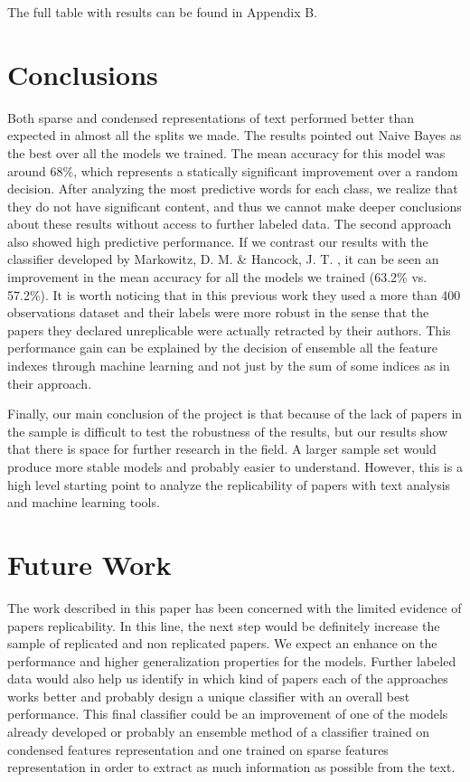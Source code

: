 \documentclass[12pt]{article}
\begin{document}
The full table with results can be found in Appendix B. 


\section{Conclusions}

Both sparse and condensed representations of text performed better than expected in almost all the splits we made. The results pointed out Naive Bayes as the best over all the models we trained. The mean accuracy for this model was around 68\%, which represents a statically significant improvement over a random decision.  After analyzing the most predictive words for each class, we realize that they do not have significant content, and thus we cannot make deeper conclusions about these results without access to further labeled data.  
The second approach also showed high predictive performance. If we contrast our results with the classifier developed by Markowitz, D. M. \& Hancock, J. T. \cite{prev2}, it can be seen an improvement in the mean accuracy for all the models we trained (63.2\% vs. 57.2\%). It is worth noticing that in this previous work they used a more than 400 observations dataset and their labels were more robust in the sense that the papers they declared unreplicable were actually retracted by their authors. This performance gain can be explained by the decision of ensemble all the feature indexes through machine learning and not just by the sum of some indices as in their approach.

Finally, our main conclusion of the project is that because of the lack of papers in the sample is difficult to test the robustness of the results, but our results show that there is space for further research in the field. A larger sample set would produce more stable models and probably easier to understand. However, this is a high level starting point to analyze the replicability of papers with text analysis and machine learning tools.   


\section{Future Work}

The work described in this paper has been concerned with the limited evidence of papers replicability. In this line, the next step would be definitely increase the sample of replicated and non replicated papers. We expect an enhance on the performance and higher generalization properties for the models. Further labeled data would also help us identify in which kind of papers each of the approaches works better and probably design a unique classifier with an overall best performance. This final classifier could be an improvement of one of the models already developed or probably an ensemble method of a classifier trained on condensed features representation and one trained on sparse features representation in order to extract as much information as possible from the text. 
\end{document}
